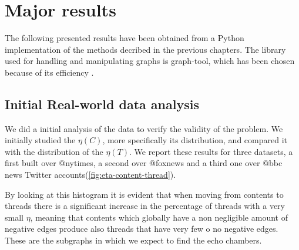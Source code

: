 \section{Major results}

The following presented results have been obtained from a Python
implementation of the methods decribed in the previous chapters. The library used
for handling and manipulating graphs is graph-tool, which has been chosen
because of its efficiency \cite{peixoto_graph-tool_2014}.

\subsection{Initial Real-world data analysis}%
\label{sub:validity_problem_definition}

We did a initial analysis of the data to verify the validity of the problem. We
initially studied the $\eta(C)$, more specifically its distribution, and
compared it with the distribution of the $\eta(T)$. We report these results for
three datasets, a first built over @nytimes, a second over @foxnews
and a third one over @bbc news Twitter accounts\footnotemark (\autoref{fig:eta-content-thread}).


By looking at this histogram it is evident that when moving from
contents to threads there is a significant increase in the percentage of
threads with a very small $\eta$, meaning that contents which globally have
a non negligible amount of negative edges produce also threads that have
very few o no negative edges. These are the subgraphs in which we expect to find
the echo chambers.

